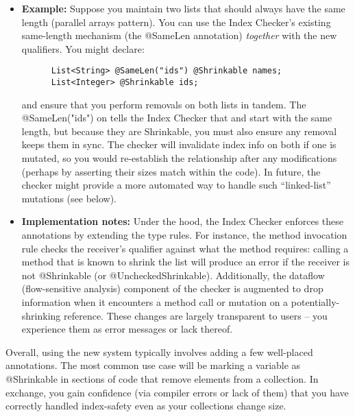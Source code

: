 \begin{itemize}
\item
  \textbf{Example:}
    Suppose you maintain two lists that should always have the same length (parallel arrays pattern).
    You can use the Index Checker’s existing same-length mechanism (the @SameLen annotation)
    \emph{together} with the new qualifiers. You might declare:

    \begin{Verbatim}
      List<String> @SameLen("ids") @Shrinkable names;
      List<Integer> @Shrinkable ids;
    \end{Verbatim}
  and ensure that you perform removals on both lists in tandem. The @SameLen("ids") on 
  tells the Index Checker that  and  start with the same length, but because
  they are Shrinkable, you must also ensure any removal keeps them in sync. The checker will
  invalidate index info on both if one is mutated, so you would re-establish the relationship
  after any modifications (perhaps by asserting their sizes match within the code). In future, the
  checker might provide a more automated way to handle such “linked-list” mutations (see below).

\item
  \textbf{Implementation notes:}
    Under the hood, the Index Checker enforces these annotations by extending the type rules.
    For instance, the method invocation rule checks the receiver’s qualifier against what the
    method requires: calling a method that is known to shrink the list will produce an error if
    the receiver is not @Shrinkable (or @UncheckedShrinkable). Additionally, the dataflow
    (flow-sensitive analysis) component of the checker is augmented to drop information when it
    encounters a method call or mutation on a potentially-shrinking reference. These changes are
    largely transparent to users – you experience them as error messages or lack thereof.
\end{itemize}
Overall, using the new system typically involves adding a few well-placed annotations. The
most common use case will be marking a variable as @Shrinkable in sections of code that
remove elements from a collection. In exchange, you gain confidence (via compiler errors or
lack of them) that you have correctly handled index-safety even as your collections change size.


